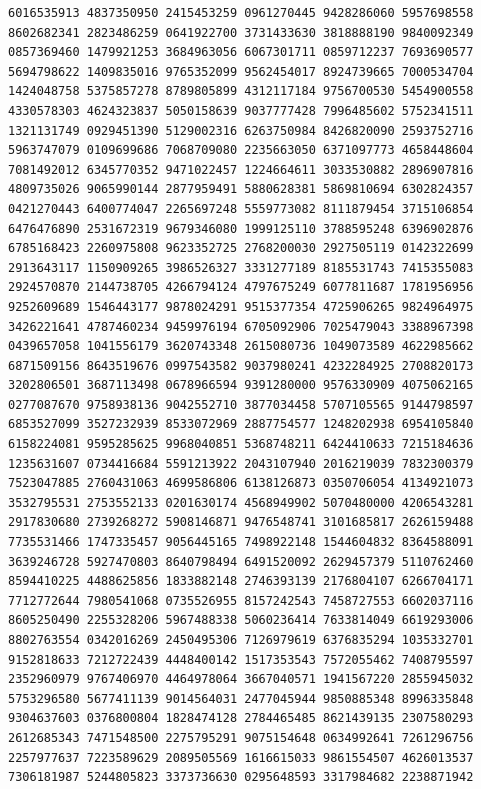 \begin{Verbatim}[fontsize=\fontsize{6.4}{7.3}\selectfont]
6016535913 4837350950 2415453259 0961270445 9428286060 5957698558 8602682341 2823486259 0641922700 3731433630 3818888190 9840092349
0857369460 1479921253 3684963056 6067301711 0859712237 7693690577 5694798622 1409835016 9765352099 9562454017 8924739665 7000534704
1424048758 5375857278 8789805899 4312117184 9756700530 5454900558 4330578303 4624323837 5050158639 9037777428 7996485602 5752341511
1321131749 0929451390 5129002316 6263750984 8426820090 2593752716 5963747079 0109699686 7068709080 2235663050 6371097773 4658448604
7081492012 6345770352 9471022457 1224664611 3033530882 2896907816 4809735026 9065990144 2877959491 5880628381 5869810694 6302824357
0421270443 6400774047 2265697248 5559773082 8111879454 3715106854 6476476890 2531672319 9679346080 1999125110 3788595248 6396902876
6785168423 2260975808 9623352725 2768200030 2927505119 0142322699 2913643117 1150909265 3986526327 3331277189 8185531743 7415355083
2924570870 2144738705 4266794124 4797675249 6077811687 1781956956 9252609689 1546443177 9878024291 9515377354 4725906265 9824964975
3426221641 4787460234 9459976194 6705092906 7025479043 3388967398 0439657058 1041556179 3620743348 2615080736 1049073589 4622985662
6871509156 8643519676 0997543582 9037980241 4232284925 2708820173 3202806501 3687113498 0678966594 9391280000 9576330909 4075062165
0277087670 9758938136 9042552710 3877034458 5707105565 9144798597 6853527099 3527232939 8533072969 2887754577 1248202938 6954105840
6158224081 9595285625 9968040851 5368748211 6424410633 7215184636 1235631607 0734416684 5591213922 2043107940 2016219039 7832300379
7523047885 2760431063 4699586806 6138126873 0350706054 4134921073 3532795531 2753552133 0201630174 4568949902 5070480000 4206543281
2917830680 2739268272 5908146871 9476548741 3101685817 2626159488 7735531466 1747335457 9056445165 7498922148 1544604832 8364588091
3639246728 5927470803 8640798494 6491520092 2629457379 5110762460 8594410225 4488625856 1833882148 2746393139 2176804107 6266704171
7712772644 7980541068 0735526955 8157242543 7458727553 6602037116 8605250490 2255328206 5967488338 5060236414 7633814049 6619293006
8802763554 0342016269 2450495306 7126979619 6376835294 1035332701 9152818633 7212722439 4448400142 1517353543 7572055462 7408795597
2352960979 9767406970 4464978064 3667040571 1941567220 2855945032 5753296580 5677411139 9014564031 2477045944 9850885348 8996335848
9304637603 0376800804 1828474128 2784465485 8621439135 2307580293 2612685343 7471548500 2275795291 9075154648 0634992641 7261296756
2257977637 7223589629 2089505569 1616615033 9861554507 4626013537 7306181987 5244805823 3373736630 0295648593 3317984682 2238871942

\end{Verbatim}
